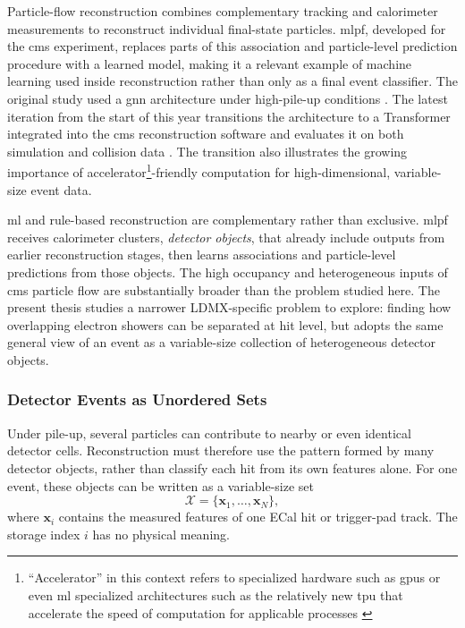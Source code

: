 Particle-flow reconstruction combines complementary tracking and calorimeter
measurements to reconstruct individual final-state particles. \Gls{mlpf},
developed for the \gls{cms} experiment, replaces parts of this association and
particle-level prediction procedure with a learned model, making it a relevant
example of machine learning used inside reconstruction rather than only as a
final event classifier. The original study used a \gls{gnn}
architecture under high-pile-up conditions \cite{pata2021-mlpf}. The latest iteration from the start of this year transitions the architecture to a Transformer integrated into the \gls{cms} reconstruction
software and evaluates it on both simulation and collision data
\cite{pata2026-mlpf}. The transition also
illustrates the growing importance of accelerator\footnote{``Accelerator'' in this context refers to specialized hardware such as \glspl{gpu} or even \gls{ml} specialized architectures such as the relatively new \gls{tpu} that accelerate the speed of computation for applicable processes \cite{sur2026-heterogeneous-computing}}-friendly computation for high-dimensional, variable-size event data.

\gls{ml} and rule-based reconstruction are complementary rather than
exclusive. \gls{mlpf} receives calorimeter clusters, \textit{detector objects}, that already include outputs from
earlier reconstruction stages, then learns associations and particle-level
predictions from those objects. The high occupancy and heterogeneous inputs of \gls{cms} particle flow
are substantially broader than the problem studied here. The present thesis studies a narrower
LDMX-specific problem to explore: finding how overlapping electron showers can be separated at hit
level, but adopts the same general view of an event as a variable-size collection of heterogeneous detector objects.


\subsubsection{Detector Events as Unordered Sets}
\label{sec:detector_set_background}

Under pile-up, several particles can contribute to nearby or even identical
detector cells. Reconstruction must therefore use the pattern formed by many
detector objects, rather than classify each hit from its own features alone.
For one event, these objects can be written as a variable-size set
\begin{equation}
    \mathcal{X}
    =
    \{\mathbf{x}_1,\ldots,\mathbf{x}_N\},
\end{equation}
where \(\mathbf{x}_i\) contains the measured features of one ECal hit or
trigger-pad track. The storage index \(i\) has no physical meaning.

